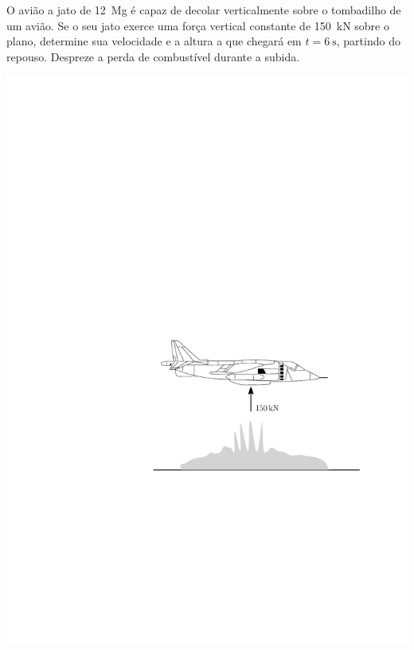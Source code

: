 \item O avião a jato de \SI{12}{\mega\g} é capaz de decolar verticalmente sobre o tombadilho de um avião. Se o seu jato exerce uma força vertical constante de \SI{150}{\kilo\newton} sobre o plano, determine sua velocidade e a altura a que chegará em $t=\SI{6}{\second}$, partindo do repouso. Despreze a perda de combustível durante a subida.

\vspace{-.5cm}
\begin{flushright}
	\includegraphics[scale=.9]{images/draw_1}
\end{flushright}